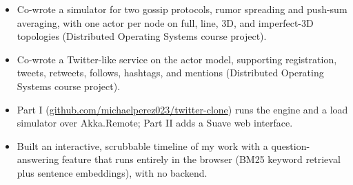 \begin{itemize}
\item Co-wrote a simulator for two gossip protocols, rumor spreading and push-sum averaging, with one actor per node on full, line, 3D, and imperfect-3D topologies (Distributed Operating Systems course project).
\end{itemize}
\begin{itemize}
\item Co-wrote a Twitter-like service on the actor model, supporting registration, tweets, retweets, follows, hashtags, and mentions (Distributed Operating Systems course project).
\item Part I (\href{https://github.com/michaelperez023/twitter-clone}{github.com/michaelperez023/twitter-clone}) runs the engine and a load simulator over Akka.Remote; Part II adds a Suave web interface.
\end{itemize}
\begin{itemize}
\item Built an interactive, scrubbable timeline of my work with a question-answering feature that runs entirely in the browser (BM25 keyword retrieval plus sentence embeddings), with no backend.
\end{itemize}

